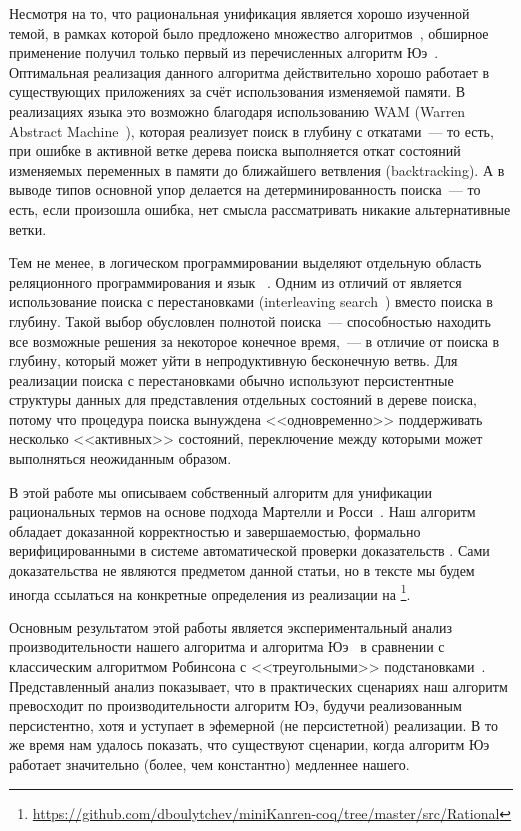 Несмотря на то, что рациональная унификация является хорошо изученной темой, в рамках которой было предложено множество алгоритмов~\cite{huet1976resolution,mukai1983unification,martelli1984efficient,jaffar1984efficient}, обширное применение получил только первый из перечисленных алгоритм Юэ~\cite{huet1976resolution}. Оптимальная реализация данного алгоритма действительно хорошо работает в существующих приложениях за счёт использования изменяемой памяти. В реализациях языка \Prolog это возможно благодаря использованию WAM (Warren Abstract Machine~\cite{warren1983abstract}), которая реализует поиск в глубину с откатами~--- то есть, при ошибке в активной ветке дерева поиска выполняется откат состояний изменяемых переменных в памяти до ближайшего ветвления (backtracking). А в выводе типов основной упор делается на детерминированность поиска~--- то есть, если произошла ошибка, нет смысла рассматривать никакие альтернативные ветки.

Тем не менее, в логическом программировании выделяют отдельную область реляционного программирования и язык \miniKanren~\cite{friedman2005reasoned}. Одним из отличий \miniKanren от \Prolog является использование поиска с перестановками (interleaving search~\cite{kiselyov2005backtracking}) вместо поиска в глубину. Такой выбор обусловлен полнотой поиска~--- способностью находить все возможные решения за некоторое конечное время,~--- в отличие от поиска в глубину, который может уйти в непродуктивную бесконечную ветвь. Для реализации поиска с перестановками обычно используют персистентные структуры данных для представления отдельных состояний в дереве поиска, потому что процедура поиска вынуждена <<одновременно>> поддерживать несколько <<активных>> состояний, переключение между которыми может выполняться неожиданным образом.

В этой работе мы описываем собственный алгоритм для унификации рациональных термов на основе подхода Мартелли и Росси~\cite{martelli1984efficient}. Наш алгоритм обладает доказанной корректностью и завершаемостью, формально верифицированными в системе автоматической проверки доказательств \Rocq. Сами доказательства не являются предметом данной статьи, но в тексте мы будем иногда ссылаться на конкретные определения из реализации на \Rocq\footnote{\url{https://github.com/dboulytchev/miniKanren-coq/tree/master/src/Rational}}.

Основным результатом этой работы является экспериментальный анализ производительности нашего алгоритма и алгоритма Юэ~\cite{huet1976resolution} в сравнении с классическим алгоритмом Робинсона с <<треугольными>> подстановками~\cite{baader2001unification}. Представленный анализ показывает, что в практических сценариях наш алгоритм превосходит по производительности алгоритм Юэ, будучи реализованным персистентно, хотя и уступает в эфемерной (не персистетной) реализации. В то же время нам удалось показать, что существуют сценарии, когда алгоритм Юэ работает значительно (более, чем константно) медленнее нашего.


